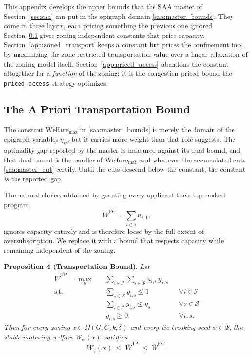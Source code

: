 \documentclass{article}
\begin{document}
This appendix develops the upper bounds that the SAA master of Section~\ref{sec:saa} can put in the epigraph domain \eqref{saa:master_bounds}. They come in three layers, each pricing something the previous one ignored. Section~\ref{app:transport_bound} gives zoning-independent constants that price capacity. Section~\ref{app:zoned_transport} keeps a constant but prices the confinement too, by maximizing the zone-restricted transportation value over a linear relaxation of the zoning model itself. Section~\ref{app:priced_access} abandons the constant altogether for a \emph{function} of the zoning; it is the congestion-priced bound the \texttt{priced\_access} strategy optimizes.

\subsection{The A Priori Transportation Bound}
\label{app:transport_bound}

The constant $\text{Welfare}_{\max}$ in \eqref{saa:master_bounds} is merely the domain of the epigraph variables $\eta_\psi$, but it carries more weight than that role suggests. The optimality gap reported by the master is measured against its dual bound, and that dual bound is the smaller of $\text{Welfare}_{\max}$ and whatever the accumulated cuts \eqref{saa:master_cut} certify. Until the cuts descend below the constant, the constant \emph{is} the reported gap.

The natural choice, obtained by granting every applicant their top-ranked program,
\begin{equation}\label{eq:welfare_fc}
\overline{W}^{\mathrm{FC}} = \sum_{i \in \mathcal{I}} u_{i, 1},
\end{equation}
ignores capacity entirely and is therefore loose by the full extent of oversubscription. We replace it with a bound that respects capacity while remaining independent of the zoning.

\noindent\textbf{Proposition 4 (Transportation Bound).} \textit{Let}
\begin{align}
\overline{W}^{\mathrm{TP}} = \max_{y} \quad & \sum_{i \in \mathcal{I}} \sum_{s \in \mathcal{S}} u_{i,s}\, y_{i,s} \label{eq:welfare_tp_obj} \\
\textrm{s.t.} \quad & \sum_{s \in \mathcal{S}} y_{i,s} \leq 1 && \forall i \in \mathcal{I} \label{eq:welfare_tp_assign} \\
& \sum_{i \in \mathcal{I}} y_{i,s} \leq q_s && \forall s \in \mathcal{S} \label{eq:welfare_tp_cap} \\
& y_{i,s} \geq 0 && \forall i, s. \label{eq:welfare_tp_domain}
\end{align}
\textit{Then for every zoning $x \in \Omega(G, C, k, \delta)$ and every tie-breaking seed $\psi \in \Psi$, the stable-matching welfare $W_\psi(x)$ satisfies}
\begin{equation}\label{eq:welfare_chain}
W_\psi(x) \;\leq\; \overline{W}^{\mathrm{TP}} \;\leq\; \overline{W}^{\mathrm{FC}}.
\end{equation}
\end{document}
